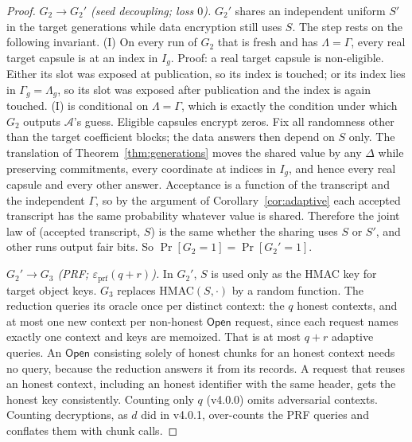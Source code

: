 \documentclass[pdflatex,sn-mathphys-num]{sn-jnl}
\theoremstyle{plain}
\theoremstyle{definition}
\begin{document}
\begin{proof}
\emph{$G_2\to G_2'$ (seed decoupling; loss $0$).} $G_2'$ shares an independent uniform $S'$ in the target generations while data encryption still uses $S$. The step rests on the following invariant. (I) On every run of $G_2$ that is fresh and has $\Lambda=\Gamma$, every real target capsule is at an index in $I_g$. Proof: a real target capsule is non-eligible. Either its slot was exposed at publication, so its index is touched; or its index lies in $\Gamma_g=\Lambda_g$, so its slot was exposed after publication and the index is again touched. (I) is conditional on $\Lambda=\Gamma$, which is exactly the condition under which $G_2$ outputs $\mathcal A$'s guess. Eligible capsules encrypt zeros. Fix all randomness other than the target coefficient blocks; the data answers then depend on $S$ only. The translation of Theorem~\ref{thm:generations} moves the shared value by any $\Delta$ while preserving commitments, every coordinate at indices in $I_g$, and hence every real capsule and every other answer. Acceptance is a function of the transcript and the independent $\Gamma$, so by the argument of Corollary~\ref{cor:adaptive} each accepted transcript has the same probability whatever value is shared. Therefore the joint law of (accepted transcript, $S$) is the same whether the sharing uses $S$ or $S'$, and other runs output fair bits. So $\Pr[G_2=1]=\Pr[G_2'=1]$.

\emph{$G_2'\to G_3$ (PRF; $\varepsilon_{\mathrm{prf}}(q+r)$).} In $G_2'$, $S$ is used only as the HMAC key for target object keys. $G_3$ replaces HMAC$(S,\cdot)$ by a random function. The reduction queries its oracle once per distinct context: the $q$ honest contexts, and at most one new context per non-honest $\mathsf{Open}$ request, since each request names exactly one context and keys are memoized. That is at most $q+r$ adaptive queries. An $\mathsf{Open}$ consisting solely of honest chunks for an honest context needs no query, because the reduction answers it from its records. A request that reuses an honest context, including an honest identifier with the same header, gets the honest key consistently. Counting only $q$ (v4.0.0) omits adversarial contexts. Counting decryptions, as $d$ did in v4.0.1, over-counts the PRF queries and conflates them with chunk calls.


\end{proof}
\end{document}
